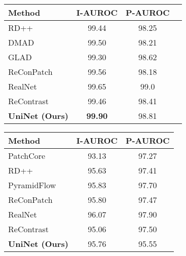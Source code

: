 \documentclass[letterpaper]{article} %
\begin{document}
\begin{table*}[htbp]
    \centering
    \begin{minipage}[t]{0.28\textwidth}
        \centering
        \caption*{(a) MVTec AD}
        \begin{tabular}{@{}lccc@{}}
            \toprule
            Method & I-AUROC & P-AUROC \\
            \midrule
            RD++  & 99.44 & 98.25  \\
            DMAD  & 99.50 & 98.21  \\
            GLAD  & 99.30 & 98.62  \\
            ReConPatch & 99.56 & 98.18 \\
            RealNet  & 99.65 & 99.0 \\
            ReContrast  & 99.46 & 98.41  \\
            \midrule
            \cellcolor{gray!20}\textbf{UniNet (Ours)} & \cellcolor{gray!20}\textbf{99.90} & \cellcolor{gray!20}98.81 \\
            \bottomrule
        \end{tabular}
    \end{minipage}
    \hfill
    \begin{minipage}[t]{0.28\textwidth}
        \centering
        \caption*{(b) BTAD}
        \begin{tabular}{@{}lcc@{}}
            \toprule
            Method & I-AUROC & P-AUROC \\
            \midrule
            PatchCore  & 93.13 & 97.27 \\
            RD++  & 95.63 & 97.41 \\
            PyramidFlow  & 95.83 & 97.70 \\
            ReConPatch  & 95.80 & 97.47 \\
            RealNet  & 96.07 & 97.90 \\
            ReContrast  & 95.06 & 97.50 \\
            \midrule
        \cellcolor{gray!20}\textbf{UniNet (Ours)} & \cellcolor{gray!20}95.76 & \cellcolor{gray!20}95.55 \\
            \bottomrule
        \end{tabular}
    \end{minipage}
    \hfill
    \begin{minipage}[t]{0.28\textwidth}
        \centering
        \caption*{(c) MVTec 3D-AD}
        \begin{tabular}{@{}lcc@{}}
            \toprule

\end{tabular}
\end{minipage}
\end{table*}
\end{document}
